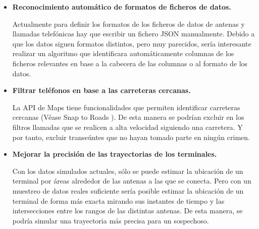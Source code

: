     \begin{itemize}
      \item \textbf{Reconocimiento automático de formatos de ficheros de datos.}
      
      Actualmente para definir los formatos de los ficheros de datos de antenas y llamadas telefónicas hay que escribir un fichero JSON manualmente. 
      Debido a que los datos siguen formatos distintos, pero muy parecidos, sería interesante realizar un algoritmo que identificara automáticamente columnas de los ficheros relevantes en base a la cabecera de las columnas o al formato de los datos.
      
      \item \textbf{Filtrar teléfonos en base a las carreteras cercanas.}
      
      La API de Maps tiene funcionalidades que permiten identificar carreteras cercanas (Véase Snap to Roads \cite{snaproad}). De esta manera se podrían excluir en los filtros llamadas que se realicen a alta velocidad siguiendo una carretera. Y por tanto, excluir transeúntes que no hayan tomado parte en ningún crimen.
      
      \item \textbf{Mejorar la precisión de las trayectorias de los terminales.}
      
      Con los datos simulados actuales, sólo se puede estimar la ubicación de un terminal por áreas alrededor de las antenas a las que se conecta.
      Pero con un muestreo de datos reales suficiente sería posible estimar la ubicación de un terminal de forma más exacta mirando sus instantes de tiempo y las intersecciones entre los rangos de las distintas antenas. De esta manera, se podría simular una trayectoria más precisa para un sospechoso.
    \end{itemize}